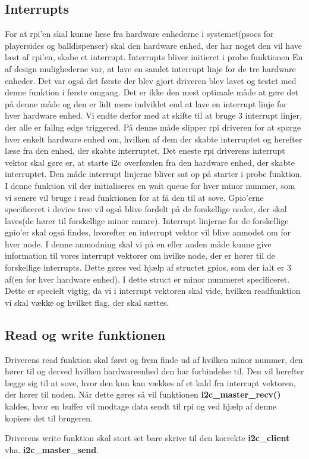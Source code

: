 \documentclass[Softwaredesign/Softwaredesign_main.tex]{subfiles}
\begin{document}
\subsection{Interrupts}
For at rpi'en skal kunne læse fra hardware enhederne i systemet(psocs for playersides og balldispenser) skal den hardware enhed, der har noget den vil have læst af rpi'en, skabe et interrupt. Interrupts bliver initieret i probe funktionen 
 En af design mulighederne var, at lave en samlet interrupt linje for de tre hardware enheder. Det var også det første der blev gjort driveren blev lavet og testet med denne funktion i første omgang. Det er ikke den mest optimale måde at gøre det på denne måde og den er lidt mere indviklet end at lave en interrupt linje for hver hardware enhed. Vi endte derfor med at skifte til at bruge 3 interrupt linjer, der alle er fallng edge triggered. På denne måde slipper rpi driveren for at spørge hver enkelt hardware enhed om, hvilken af dem der skabte interruptet og herefter læse fra den enhed, der skabte interruptet. Det eneste rpi driverens interrupt vektor skal gøre er, at starte i2c overførslen fra den hardware enhed, der skabte interruptet. Den måde interrupt linjerne bliver sat op på starter i probe funktion. I denne funktion vil der initialiseres en wait queue for hver minor nummer, som vi senere vil bruge i  read funktionen for at få den til at sove. Gpio'erne specificeret i device tree vil også blive fordelt på de forskellige noder, der skal laves(de hører til forskellige minor numre). Interrupt linjerne for de forskellige gpio'er skal også findes, hvorefter en interrupt vektor vil blive anmodet om for hver node. I denne anmodning skal vi på en eller anden måde kunne give information til vores interrupt vektorer om hvilke node, der er hører til de forskellige interrupts. Dette gøres ved hjælp af structet gpios, som der ialt er 3 af(en for hver hardware enhed). I dette struct er minor nummeret specificeret. Dette er specielt vigtig, da vi i interrupt vektoren skal vide, hvilken readfunktion vi skal vække og hvilket flag, der skal sættes. 
 
 \subsection{Read og write funktionen}
 Driverens read funktion skal først og frem finde ud af hvilken minor nummer, den hører til og derved hvilken hardwareenhed den har forbindelse til. Den vil herefter lægge sig til at sove, hvor den kun kan vækkes af et kald fra interrupt vektoren, der hører til noden. Når dette gøres så vil funktionen \textbf{i2c\_master\_recv()} kaldes, hvor en buffer vil modtage data sendt til rpi og ved hjælp af denne kopiere det til brugeren.
 
 Driverens write funktion skal stort set bare skrive til den korrekte \textbf{i2c\_client} vha. \textbf{i2c\_master\_send}.
\end{document}
